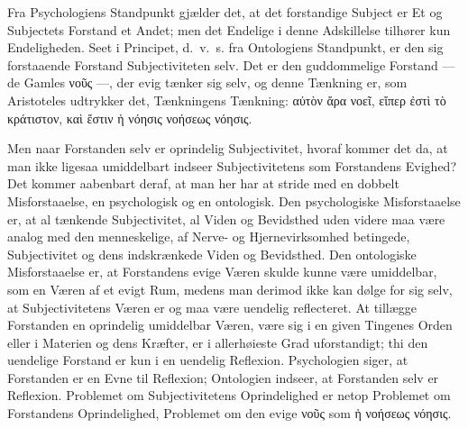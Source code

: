 \documentclass[12pt]{book}
\newcommand{\opage}[1]{\marginnote{\footnotesize\textit{[#1]}}}
\begin{document}
Fra Psychologiens Standpunkt gjælder det, at det forstandige Subject er Et og
Subjectets Forstand et Andet; men det Endelige i denne Adskillelse tilhører kun
Endeligheden. Seet i Principet, d.~v.~s. fra Ontologiens Standpunkt, er
\opage{63} den sig forstaaende Forstand Subjectiviteten selv. Det er den guddommelige Forstand
--- de Gamles νοῦς ---, der evig tænker sig selv, og denne Tænkning er, som
Aristoteles udtrykker det, Tænkningens Tænkning: αὐτὸν ἄρα νοεῖ, εἴπερ ἐστὶ τὸ
κράτιστον, καὶ ἔστιν ἡ νόησις νοήσεως νόησις.

Men naar Forstanden selv er oprindelig Subjectivitet, hvoraf kommer det da, at man
ikke ligesaa umiddelbart indseer Subjectivitetens som Forstandens Evighed? Det
kommer aabenbart deraf, at man her har at stride med en dobbelt Misforstaaelse, en
psychologisk og en ontologisk. Den psychologiske Misforstaaelse er, at al tænkende
Subjectivitet, al Viden og Bevidsthed uden videre maa være analog med den
menneskelige, af Nerve- og Hjernevirksomhed betingede, Subjectivitet og dens
indskrænkede Viden og Bevidsthed. Den ontologiske Misforstaaelse er, at
Forstandens evige Væren skulde kunne være umiddelbar, som en Væren af et evigt Rum,
medens man derimod ikke kan dølge for sig selv, at Subjectivitetens Væren er og maa
være uendelig reflecteret. At tillægge Forstanden en oprindelig umiddelbar Væren,
være sig i en given Tingenes Orden eller i Materien og dens Kræfter, er i
allerhøieste Grad uforstandigt; thi den uendelige Forstand er kun i en uendelig
Reflexion. Psychologien siger, at Forstanden er en Evne til Reflexion; Ontologien
indseer, at Forstanden selv er Reflexion. Problemet om Subjectivitetens
Oprindelighed er netop Problemet om Forstandens Oprindelighed, Problemet om den
evige νοῦς som ἡ νοήσεως νόησις.
\end{document}
